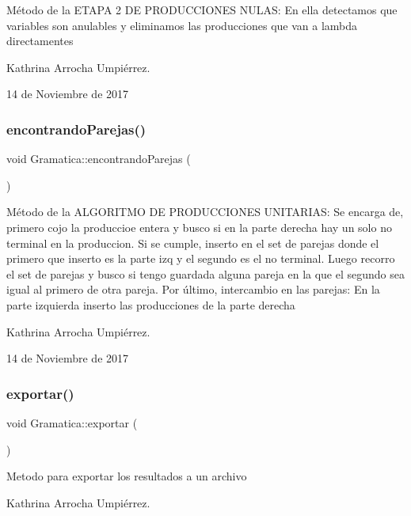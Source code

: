 Método de la E\+T\+A\+PA 2 DE P\+R\+O\+D\+U\+C\+C\+I\+O\+N\+ES N\+U\+L\+AS\+: En ella detectamos que variables son anulables y eliminamos las producciones que van a lambda directamentes

Kathrina Arrocha Umpiérrez.

14 de Noviembre de 2017 \mbox{\label{class_gramatica_a3698e12aeff2c571d43e38ecc7ae655f}} 
\subsubsection{\texorpdfstring{encontrando\+Parejas()}{encontrandoParejas()}}
{\footnotesize\ttfamily void Gramatica\+::encontrando\+Parejas (\begin{DoxyParamCaption}{ }\end{DoxyParamCaption})}

Método de la A\+L\+G\+O\+R\+I\+T\+MO DE P\+R\+O\+D\+U\+C\+C\+I\+O\+N\+ES U\+N\+I\+T\+A\+R\+I\+AS\+: Se encarga de, primero cojo la produccioe entera y busco si en la parte derecha hay un solo no terminal en la produccion. Si se cumple, inserto en el set de parejas donde el primero que inserto es la parte izq y el segundo es el no terminal. Luego recorro el set de parejas y busco si tengo guardada alguna pareja en la que el segundo sea igual al primero de otra pareja. Por último, intercambio en las parejas\+: En la parte izquierda inserto las producciones de la parte derecha

Kathrina Arrocha Umpiérrez.

14 de Noviembre de 2017 \mbox{\label{class_gramatica_ae18ba291a24ebcb6faff237c4eb33c29}} 
\subsubsection{\texorpdfstring{exportar()}{exportar()}}
{\footnotesize\ttfamily void Gramatica\+::exportar (\begin{DoxyParamCaption}{ }\end{DoxyParamCaption})}

Metodo para exportar los resultados a un archivo

Kathrina Arrocha Umpiérrez.

